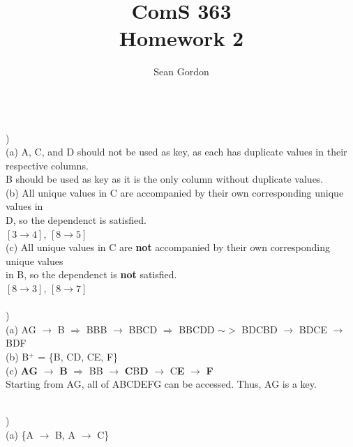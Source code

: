 \documentclass[12pt]{article}
\title{ComS 363\\Homework 2}
\author{Sean Gordon}
\begin{document}
\maketitle


\hrulefill \\



)\\
\indent \indent (a) A, C, and D should not be used as key, as each has duplicate values in their\\ 
\indent \indent respective columns.\\
\indent \indent B should be used as key as it is the only column without duplicate values.\\

\indent (b) All unique values in C are accompanied by their own corresponding unique values in \\
\indent \indent D, so the dependenct is satisfied.\\
\indent \indent $[3 \rightarrow 4]$, $[8 \rightarrow 5]$\\

\indent (c) All unique values in C are \textbf{not} accompanied by their own corresponding unique values\\
\indent \indent in B, so the dependenct is \textbf{not} satisfied.\\
\indent \indent $[8 \rightarrow 3]$, $[8 \rightarrow 7]$\\


\hrulefill\\


)\\
\indent \indent (a) AG $\rightarrow$ B $\Rightarrow$ BBB $\rightarrow$ BBCD $\Rightarrow$ BBCDD $\sim>$ BDCBD $\rightarrow$ BDCE $\rightarrow$ BDF\\

\indent \indent (b) B$^+$ = \{B, CD, CE, F\}\\

\indent \indent (c) \textbf{AG} $\rightarrow$ \textbf{B} $\Rightarrow$ BB $\rightarrow$ \textbf{C}B\textbf{D} $\rightarrow$  C\textbf{E} $\rightarrow$ \textbf{F}\\
\indent \indent Starting from AG, all of ABCDEFG can be accessed. Thus, AG is a key.\\


\hrulefill\\
\pagebreak


) \\
\indent \indent (a) \{A $\rightarrow$ B, A $\rightarrow$ C\}\\
\end{document}
